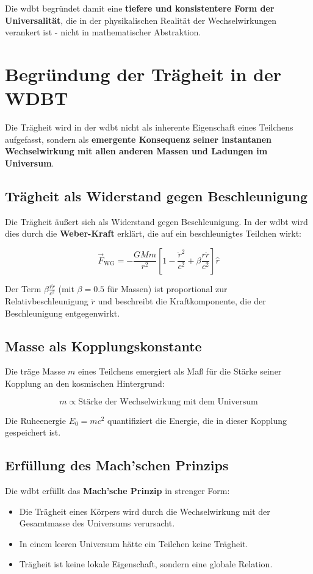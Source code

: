 Die \gls{wdbt} begründet damit eine \textbf{tiefere und konsistentere Form der Universalität}, die in der physikalischen Realität der Wechselwirkungen verankert ist - nicht in mathematischer Abstraktion.

\section{Begründung der Trägheit in der WDBT}

Die Trägheit wird in der \gls{wdbt} nicht als inherente Eigenschaft eines Teilchens aufgefasst, sondern als \textbf{emergente Konsequenz seiner instantanen Wechselwirkung mit allen anderen Massen und Ladungen im Universum}.

\subsection{Trägheit als Widerstand gegen Beschleunigung}
Die Trägheit äußert sich als Widerstand gegen Beschleunigung. In der \gls{wdbt} wird dies durch die \textbf{Weber-Kraft} erklärt, die auf ein beschleunigtes Teilchen wirkt:

\[
\vec{F}_{\text{WG}} = -\frac{G M m}{r^2} \left[ 1 - \frac{\dot{r}^2}{c^2} + \beta \frac{r \ddot{r}}{c^2} \right] \hat{r}
\]

Der Term $\beta \frac{r \ddot{r}}{c^2}$ (mit $\beta = 0.5$ für Massen) ist proportional zur Relativbeschleunigung $\ddot{r}$ und beschreibt die Kraftkomponente, die der Beschleunigung entgegenwirkt.

\subsection{Masse als Kopplungskonstante}
Die träge Masse $m$ eines Teilchens emergiert als Maß für die Stärke seiner Kopplung an den kosmischen Hintergrund:

\[
m \propto \text{Stärke der Wechselwirkung mit dem Universum}
\]

Die Ruheenergie $E_0 = m c^2$ quantifiziert die Energie, die in dieser Kopplung gespeichert ist.

\subsection{Erfüllung des Mach'schen Prinzips}
Die \gls{wdbt} erfüllt das \textbf{Mach'sche Prinzip} in strenger Form:
\begin{itemize}
    \item Die Trägheit eines Körpers wird durch die Wechselwirkung mit der Gesamtmasse des Universums verursacht.
    \item In einem leeren Universum hätte ein Teilchen keine Trägheit.
    \item Trägheit ist keine lokale Eigenschaft, sondern eine globale Relation.
\end{itemize}

